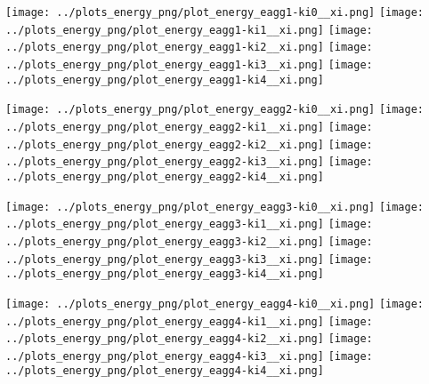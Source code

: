\begin{minipage}{0.25\textwidth} 
 \texttt{[image: ../plots\_energy\_png/plot\_energy\_eagg1-ki0\_\_xi.png]}
\texttt{[image: ../plots\_energy\_png/plot\_energy\_eagg1-ki1\_\_xi.png]}
\texttt{[image: ../plots\_energy\_png/plot\_energy\_eagg1-ki2\_\_xi.png]}
\texttt{[image: ../plots\_energy\_png/plot\_energy\_eagg1-ki3\_\_xi.png]}
\texttt{[image: ../plots\_energy\_png/plot\_energy\_eagg1-ki4\_\_xi.png]}
\end{minipage}%
\begin{minipage}{0.25\textwidth} 
 \texttt{[image: ../plots\_energy\_png/plot\_energy\_eagg2-ki0\_\_xi.png]}
\texttt{[image: ../plots\_energy\_png/plot\_energy\_eagg2-ki1\_\_xi.png]}
\texttt{[image: ../plots\_energy\_png/plot\_energy\_eagg2-ki2\_\_xi.png]}
\texttt{[image: ../plots\_energy\_png/plot\_energy\_eagg2-ki3\_\_xi.png]}
\texttt{[image: ../plots\_energy\_png/plot\_energy\_eagg2-ki4\_\_xi.png]}
\end{minipage}%
\begin{minipage}{0.25\textwidth} 
 \texttt{[image: ../plots\_energy\_png/plot\_energy\_eagg3-ki0\_\_xi.png]}
\texttt{[image: ../plots\_energy\_png/plot\_energy\_eagg3-ki1\_\_xi.png]}
\texttt{[image: ../plots\_energy\_png/plot\_energy\_eagg3-ki2\_\_xi.png]}
\texttt{[image: ../plots\_energy\_png/plot\_energy\_eagg3-ki3\_\_xi.png]}
\texttt{[image: ../plots\_energy\_png/plot\_energy\_eagg3-ki4\_\_xi.png]}
\end{minipage}%
\begin{minipage}{0.25\textwidth} 
 \texttt{[image: ../plots\_energy\_png/plot\_energy\_eagg4-ki0\_\_xi.png]}
\texttt{[image: ../plots\_energy\_png/plot\_energy\_eagg4-ki1\_\_xi.png]}
\texttt{[image: ../plots\_energy\_png/plot\_energy\_eagg4-ki2\_\_xi.png]}
\texttt{[image: ../plots\_energy\_png/plot\_energy\_eagg4-ki3\_\_xi.png]}
\texttt{[image: ../plots\_energy\_png/plot\_energy\_eagg4-ki4\_\_xi.png]}
\end{minipage}%
